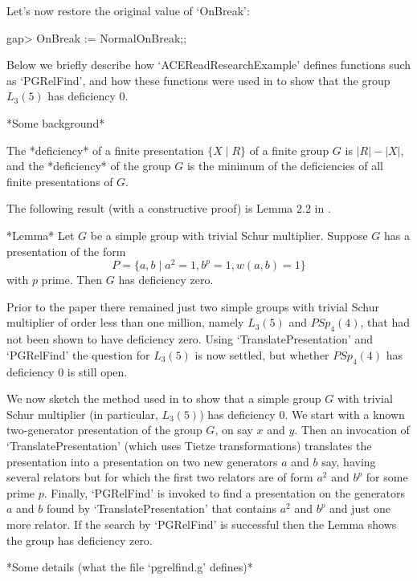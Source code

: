 Let's now restore the original value of `OnBreak':

\beginexample
gap> OnBreak := NormalOnBreak;;
\endexample


Below  we  briefly  describe  how   `ACEReadResearchExample'   defines
functions such as `PGRelFind', and how these functions  were  used  in
\cite{CHHR00} to show that the group $L_3(5)$ has deficiency 0.

*Some background*

The *deficiency* of a finite presentation $\{X \mid R\}$ of  a  finite
group $G$ is $|R| - |X|$, and the *deficiency* of the group $G$ is the
minimum of the deficiencies of all finite presentations of $G$.

The following result (with a  constructive  proof)  is  Lemma  2.2  in
\cite{CHHR00}.

*Lemma*
Let $G$ be a simple group with trivial Schur multiplier.  Suppose  $G$
has a presentation of the form
$$
P = \{ a, b \mid a^2=1, b^p=1, w(a,b)=1\}
$$
with $p$ prime. Then $G$ has deficiency zero.

Prior to the paper \cite{CHHR00} there remained just two simple groups
with trivial Schur multiplier of order less than one  million,  namely
$L_3(5)$ and $PSp_4(4)$, that had not been shown  to  have  deficiency
zero. Using `TranslatePresentation' and `PGRelFind' the  question  for
$L_3(5)$ is now settled, but whether $PSp_4(4)$ has  deficiency  0  is
still open.

We now sketch the method used in \cite{CHHR00} to show that  a  simple
group $G$ with trivial Schur multiplier (in particular, $L_3(5)$)  has
deficiency 0. We start with a known two-generator presentation of  the
group  $G$,  on   say   $x$   and   $y$.   Then   an   invocation   of
`TranslatePresentation' (which uses Tietze transformations) translates
the presentation into a presentation on two new generators $a$ and $b$
say, having several relators but for which the first two relators  are
of form $a^2$ and $b^p$ for some prime $p$.  Finally,  `PGRelFind'  is
invoked to find a presentation on the generators $a$ and $b$ found  by
`TranslatePresentation' that contains $a^2$ and  $b^p$  and  just  one
more relator. If the search by  `PGRelFind'  is  successful  then  the
Lemma shows the group has deficiency zero.


*Some details (what the file `pgrelfind.g' defines)*


